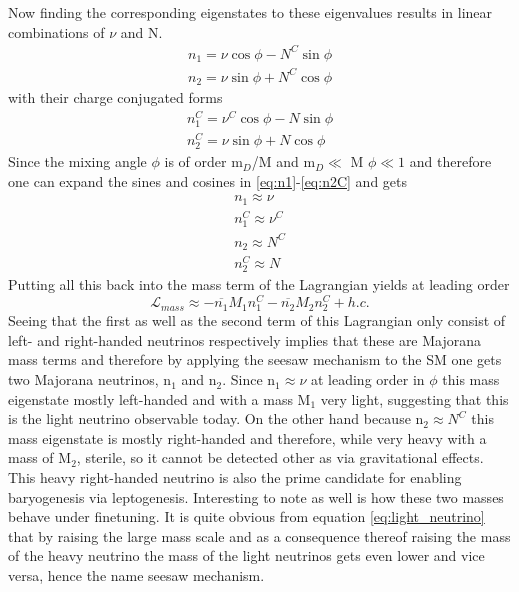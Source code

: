 Now finding the corresponding eigenstates to these eigenvalues results in linear combinations of $\nu$ and N.
\begin{align}
	n_{1}=\nu\cos\phi-N^C\sin\phi
	\label{eq:n1}
	\\
	n_{2}=\nu\sin\phi+N^C\cos\phi
	\label{eq:n2}
\end{align}
with their charge conjugated forms
\begin{align}
n_{1}^C=\nu^C\cos\phi-N\sin\phi
\label{eq:n1C}
\\
n_{2}^C=\nu\sin\phi+N\cos\phi
\label{eq:n2C}
\end{align}
Since the mixing angle $\phi$ is of order m$_D$/M and m$_D\ll$ M $\phi\ll1$ and therefore one can expand the sines and cosines in \ref{eq:n1}-\ref{eq:n2C} and gets
\begin{align}
	n_{1}\approx\nu\\
	n_{1}^C\approx\nu^C\\
	n_{2}\approx N^C\\
	n_{2}^C\approx N
\end{align}
Putting all this back into the mass term of the Lagrangian yields at leading order
\begin{equation}
	\mathcal{L}_{mass}\approx-\overline{n_1}M_1n_1^C-\overline{n_2}M_2n_2^C+h.c.
\end{equation}
Seeing that the first as well as the second term of this Lagrangian only consist of left- and right-handed neutrinos respectively implies that these are Majorana mass terms and therefore by applying the seesaw mechanism to the SM one gets two Majorana neutrinos, n$_1$ and n$_2$. \newline
Since n$_{1}\approx\nu$ at leading order in $\phi$ this mass eigenstate mostly left-handed and with a mass M$_1$ very light, suggesting that this is the light neutrino observable today.\newline
On the other hand because n$_{2}\approx N^C$ this mass eigenstate is mostly right-handed and therefore, while very heavy with a mass of M$_2$, sterile, so it cannot be detected other as via gravitational effects. This heavy right-handed neutrino is also the prime candidate for enabling baryogenesis via leptogenesis. \newline
Interesting to note as well is how these two masses behave under finetuning. It is quite obvious from equation \ref{eq:light_neutrino} that by raising the large mass scale and as a consequence thereof raising the mass of the heavy neutrino the mass of the light neutrinos gets even lower and vice versa, hence the name seesaw mechanism. 
